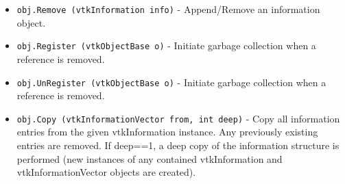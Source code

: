 \begin{itemize}
\item  \verb|obj.Remove (vtkInformation info)| -  Append/Remove an information object.

\item  \verb|obj.Register (vtkObjectBase o)| -  Initiate garbage collection when a reference is removed.

\item  \verb|obj.UnRegister (vtkObjectBase o)| -  Initiate garbage collection when a reference is removed.

\item  \verb|obj.Copy (vtkInformationVector from, int deep)| -  Copy all information entries from the given vtkInformation
 instance.  Any previously existing entries are removed.  If 
 deep==1, a deep copy of the information structure is performed (new 
 instances of any contained vtkInformation and vtkInformationVector 
 objects are created).

\end{itemize}
